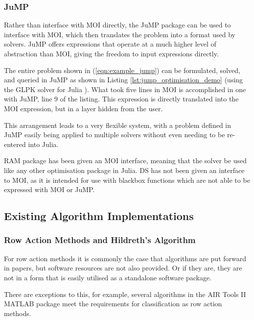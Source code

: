 \subsubsection{\ac{JuMP}}
Rather than interface with \ac{MOI} directly, the \ac{JuMP} package can be used to interface with \ac{MOI}, which then translates the problem into a format used by solvers. \ac{JuMP} offers expressions that operate at a much higher level of abstraction than \ac{MOI}, giving the freedom to input expressions directly. 

The entire problem shown in (\ref{eqn:example_jump}) can be formulated, solved, and queried in \ac{JuMP} as shown in Listing \ref{lst:jump_optimisation_demo} (using the GLPK solver for Julia \cite{JuliaOpt/GLPK.jl:Julia}). What took five lines in \ac{MOI} is accomplished in one with \ac{JuMP}, line 9 of the listing. This expression is directly translated into the \ac{MOI} expression, but in a layer hidden from the user. 



This arrangement leads to a very flexible system, with a problem defined in \ac{JuMP} easily being applied to multiple solvers without even needing to be re-entered into Julia. 

\ac{RAM} package has been given an \ac{MOI} interface, meaning that the solver be used like any other optimisation package in Julia. \ac{DS} has not been given an interface to \ac{MOI}, as it is intended for use with blackbox functions which are not able to be expressed with \ac{MOI} or \ac{JuMP}.

\subsection{Existing Algorithm Implementations}

\subsubsection{Row Action Methods and Hildreth's Algorithm}
For row action methods it is commonly the case that algorithms are put forward in papers, but software resources are not also provided. Or if they are, they are not in a form that is easily utilised as a standalone software package.

There are exceptions to this, for example, several algorithms in the AIR Tools II MATLAB package \cite{Hansen2018AIRImplementation} meet the requirements for classification as row action methods.

